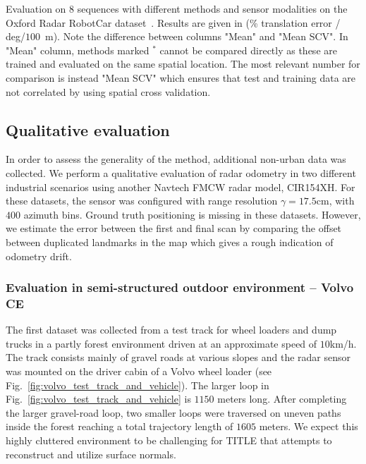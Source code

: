 \begin{table*}
\caption{Evaluation on 8 sequences with different methods and sensor modalities on the Oxford Radar RobotCar dataset~\cite{RadarRobotCarDatasetICRA2020}.  Results are given in (\% translation error / deg/$100$~m). Note the difference between columns "Mean" and "Mean SCV". In "Mean" column, methods marked $^*$ cannot be compared directly as these are trained and evaluated on the same spatial location. The most relevant number for comparison is instead "Mean SCV" which ensures that test and training data are not correlated by using spatial cross validation. 
}
\label{tab:results}
\vspace{-0.2cm}
\end{table*}












\subsection{Qualitative evaluation}
In order to assess the generality of the method, additional non-urban  data was collected. We perform a qualitative evaluation of radar odometry in two different industrial scenarios using 
another Navtech \ac{FMCW} radar model,
CIR154XH. 
For these datasets, the sensor was configured with range resolution $\gamma=17.5$cm, with $400$ azimuth bins. Ground truth positioning is missing in these datasets. However, we estimate the error between the first and final scan by comparing the offset between duplicated landmarks in the map which gives a rough indication of odometry drift.


\subsubsection{Evaluation in semi-structured outdoor environment -- Volvo CE}
\label{sec:volvo_eval}

The first dataset was collected from a test track for wheel loaders and dump trucks in a partly forest environment driven at an approximate speed of $10$km/h. The track consists mainly of gravel roads at various slopes and the radar sensor was mounted on the driver cabin of a Volvo wheel loader (see Fig.~\ref{fig:volvo_test_track_and_vehicle}). The larger loop in Fig.~\ref{fig:volvo_test_track_and_vehicle} is $1150$ meters long. After completing the larger gravel-road loop, two smaller loops were traversed on uneven paths inside the forest reaching a total trajectory length of $1605$ meters. We expect this highly cluttered environment to be challenging for \ac{TITLE} that attempts to reconstruct and utilize surface normals.








